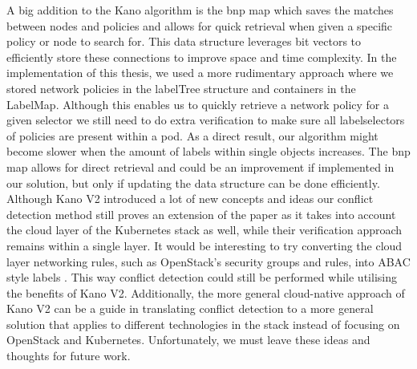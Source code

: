 A big addition to the Kano algorithm is the \acrfull{bnp} map which saves the matches between nodes and policies and allows for quick retrieval when given a specific policy or node to search for. This data structure leverages bit vectors to efficiently store these connections to improve space and time complexity. In the implementation of this thesis, we used a more rudimentary approach where we stored network policies in the labelTree structure and containers in the LabelMap. Although this enables us to quickly retrieve a network policy for a given selector we still need to do extra verification to make sure all labelselectors of policies are present within a pod. As a direct result, our algorithm might become slower when the amount of labels within single objects increases. The \acrshort{bnp} map allows for direct retrieval and could be an improvement if implemented in our solution, but only if updating the data structure can be done efficiently.
\\[10pt]

Although Kano V2 introduced a lot of new concepts and ideas our conflict detection method still proves an extension of the paper as it takes into account the cloud layer of the Kubernetes stack as well, while their verification approach remains within a single layer. It would be interesting to try converting the cloud layer networking rules, such as OpenStack's security groups and rules, into ABAC style labels \cite{sg} \cite{sgrule}. This way conflict detection could still be performed while utilising the benefits of Kano V2. Additionally, the more general cloud-native approach of Kano V2 can be a guide in translating conflict detection to a more general solution that applies to different technologies in the stack instead of focusing on OpenStack and Kubernetes. Unfortunately, we must leave these ideas and thoughts for future work.

\cleardoublepage
